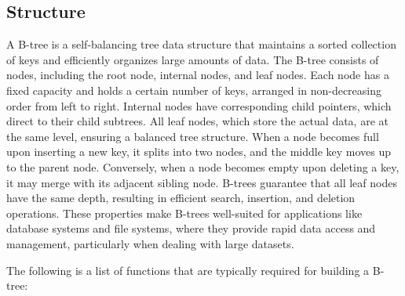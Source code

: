 \subsection*{Structure}

A B-tree is a self-balancing tree data structure that maintains a sorted collection of keys and efficiently organizes large amounts of data. The B-tree consists of nodes, including the root node, internal 
nodes, and leaf nodes. Each node has a fixed capacity and holds a certain number of keys, arranged in non-decreasing order from left to right. Internal nodes have corresponding child pointers, which 
direct to their child subtrees. All leaf nodes, which store the actual data, are at the same level, ensuring a balanced tree structure. When a node becomes full upon inserting a new key, it splits into two 
nodes, and the middle key moves up to the parent node. Conversely, when a node becomes empty upon deleting a key, it may merge with its adjacent sibling node. B-trees guarantee that all leaf nodes have the 
same depth, resulting in efficient search, insertion, and deletion operations. These properties make B-trees well-suited for applications like database systems and file systems, where they provide rapid 
data access and management, particularly when dealing with large datasets.

The following is a list of functions that are typically required for building a B-tree:

